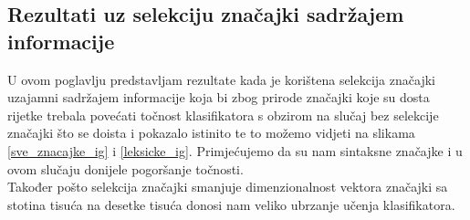 \subsection{Rezultati uz selekciju značajki sadržajem informacije}

U ovom poglavlju predstavljam rezultate kada je korištena selekcija značajki uzajamni sadržajem informacije koja bi zbog prirode značajki koje su dosta rijetke trebala povećati točnost klasifikatora s obzirom na slučaj bez selekcije značajki što se doista i pokazalo istinito te to možemo vidjeti na slikama \ref{sve_znacajke_ig} i \ref{leksicke_ig}. Primjećujemo da su nam sintaksne značajke i u ovom slučaju donijele pogoršanje točnosti. \\
	Također pošto selekcija značajki smanjuje dimenzionalnost vektora značajki sa stotina tisuća na desetke tisuća donosi nam veliko ubrzanje učenja klasifikatora.

